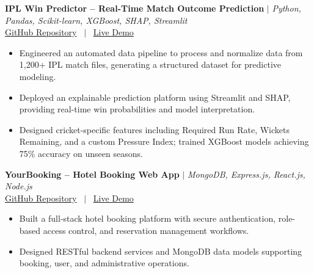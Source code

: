 \documentclass[10pt, a4paper]{article}
\begin{document}
\textbf{IPL Win Predictor -- Real-Time Match Outcome Prediction} $|$ \textit{Python, Pandas, Scikit-learn, XGBoost, SHAP, Streamlit} \\

\small{
\href{https://github.com/PankajKumar-11/IPL-Win-Predictor}{GitHub Repository}
 \ $|$ \ \href{https://demo.example.com}{Live Demo}
} \\

\begin{itemize}

    \item Engineered an automated data pipeline to process and normalize data from 1,200+ IPL match files, generating a structured dataset for predictive modeling.

    \item Deployed an explainable prediction platform using Streamlit and SHAP, providing real-time win probabilities and model interpretation.

    \item Designed cricket-specific features including Required Run Rate, Wickets Remaining, and a custom Pressure Index; trained XGBoost models achieving 75\% accuracy on unseen seasons.

\end{itemize}
\vspace{2pt}

\textbf{YourBooking -- Hotel Booking Web App} $|$ \textit{MongoDB, Express.js, React.js, Node.js} \\

\small{
\href{https://github.com/PankajKumar-11/YourBooking}{GitHub Repository}
 \ $|$ \ \href{https://demo.example.com}{Live Demo}
} \\

\begin{itemize}

    \item Built a full-stack hotel booking platform with secure authentication, role-based access control, and reservation management workflows.

    \item Designed RESTful backend services and MongoDB data models supporting booking, user, and administrative operations.

\end{itemize}
\vspace{2pt}


\end{document}
